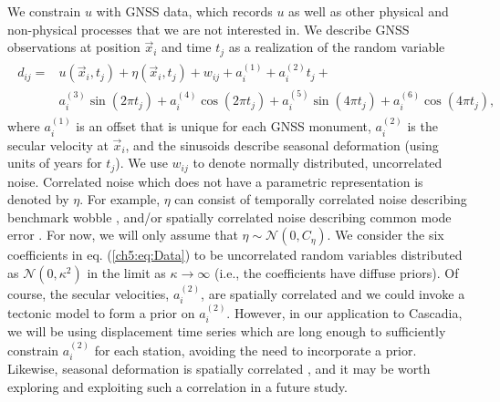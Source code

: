 We constrain $u$ with GNSS data, which records $u$ as well as other
physical and non-physical processes that we are not interested in. We
describe GNSS observations at position $\vec{x}_i$ and time $t_j$ as a
realization of the random variable
\begin{align}\label{ch5:eq:Data}
\begin{split}
d_{ij} = &u(\vec{x}_i,t_j) + \eta(\vec{x}_i,t_j) + w_{ij} + a^{(1)}_i + a^{(2)}_it_j + \\
         &a^{(3)}_i\sin(2 \pi t_j) + a^{(4)}_i\cos(2 \pi t_j) + a^{(5)}_i\sin(4 \pi t_j) + a^{(6)}_i\cos(4 \pi t_j), 
\end{split}
\end{align}
where $a^{(1)}_{i}$ is an offset that is unique for each GNSS
monument, $a^{(2)}_{i}$ is the secular velocity at $\vec{x}_i$, and
the sinusoids describe seasonal deformation (using units of years for
$t_j$). We use $w_{ij}$ to denote normally distributed, uncorrelated
noise. Correlated noise which does not have a parametric
representation is denoted by $\eta$.  For example, $\eta$ can consist
of temporally correlated noise describing benchmark wobble
\citep[e.g.,][]{Wyatt1982,Wyatt1989}, and/or spatially correlated
noise describing common mode error \citep[e.g.,][]{Wdowinski1997}. For
now, we will only assume that $\eta \sim \mathcal{N}(0,C_\eta)$. We
consider the six coefficients in eq. (\ref{ch5:eq:Data}) to be
uncorrelated random variables distributed as $\mathcal{N}(0,\kappa^2)$
in the limit as $\kappa \to \infty$ (i.e., the coefficients have
diffuse priors). Of course, the secular velocities, $a^{(2)}_{i}$, are
spatially correlated and we could invoke a tectonic model to form a
prior on $a^{(2)}_{i}$. However, in our application to Cascadia, we
will be using displacement time series which are long enough to
sufficiently constrain $a^{(2)}_{i}$ for each station, avoiding the
need to incorporate a prior. Likewise, seasonal deformation is
spatially correlated \citep{Dong2002,Langbein2008}, and it may be
worth exploring and exploiting such a correlation in a future study.

